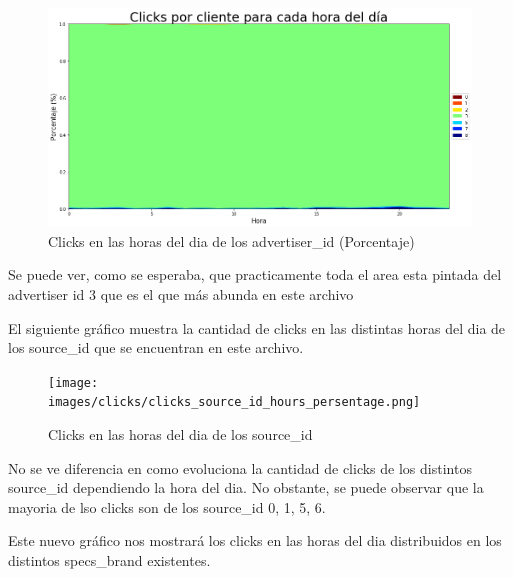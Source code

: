 \documentclass[a4paper, 12pt]{article}
\newcommand\tab[1][1cm]{\hspace*{#1}}
\begin{document}
		\FloatBarrier
		\begin{figure}[h]
			\centering
			\includegraphics[width=\textwidth]{images/clicks/clicks_advertiser_id_hours_persentage.png}
			\caption{Clicks en las horas del dia de los advertiser_id (Porcentaje)}
		\end{figure}
		\FloatBarrier



		\tab Se puede ver, como se esperaba, que practicamente toda el area esta pintada del advertiser id 3 que es el que más abunda en este archivo

		\tab El siguiente gráfico muestra la cantidad de clicks en las distintas horas del dia de los source_id que se encuentran en este archivo.
		
		\FloatBarrier
		\begin{figure}[h]
			\centering
			\texttt{[image: images/clicks/clicks\_source\_id\_hours\_persentage.png]}
			\caption{Clicks en las horas del dia de los source_id}
		\end{figure}
		\FloatBarrier

	
		\tab No se ve diferencia en como evoluciona la cantidad de clicks de los distintos source_id dependiendo la hora del dia. No obstante, se puede observar que la mayoria de lso clicks son de los source_id 0, 1, 5, 6.

		
		\tab Este nuevo gráfico nos mostrará los clicks en las horas del dia distribuidos en los distintos specs_brand existentes.
\end{document}
